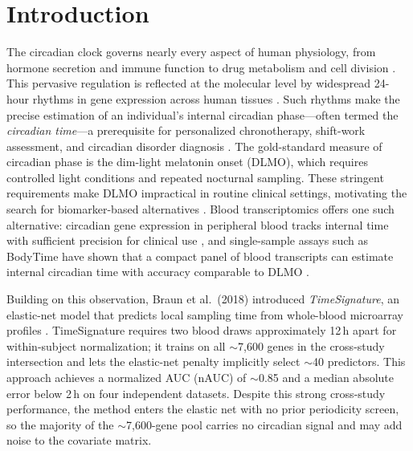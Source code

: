 \documentclass[10pt,a4paper]{article}
\begin{document}
\section{Introduction}

The circadian clock governs nearly every aspect of human physiology,
from hormone secretion and immune function to drug metabolism and cell
division \citep{Reppert2002}.
This pervasive regulation is reflected at the molecular level by
widespread 24-hour rhythms in gene expression across human tissues
\citep{Talamanca2023}.
Such rhythms make the precise estimation of an
individual's internal circadian phase---often termed the
\emph{circadian time}---a prerequisite for personalized chronotherapy,
shift-work assessment, and circadian disorder diagnosis
\citep{Archer2014}.
The gold-standard measure of circadian phase is the dim-light
melatonin onset (DLMO), which requires controlled light conditions
and repeated nocturnal sampling.
These stringent requirements make DLMO impractical in routine clinical
settings, motivating the search for biomarker-based alternatives
\citep{Ueda2004}.
Blood transcriptomics offers one such alternative: circadian gene
expression in peripheral blood tracks internal time with sufficient
precision for clinical use \citep{Moller2013}, and single-sample
assays such as BodyTime have shown that a compact panel of blood
transcripts can estimate internal circadian time with accuracy
comparable to DLMO \citep{Wittenbrink2018}.

Building on this observation, Braun et al.\ (2018) introduced
\emph{TimeSignature}, an elastic-net model that predicts local
sampling time from whole-blood microarray profiles \citep{Braun2018}.
TimeSignature requires two blood draws approximately 12\,h apart for
within-subject normalization;
it trains on all ${\sim}$7,600 genes in
the cross-study intersection and lets the elastic-net penalty
implicitly select ${\sim}$40 predictors.
This approach achieves a normalized AUC (nAUC) of ${\sim}$0.85 and a
median absolute error below 2\,h on four independent datasets.
Despite this strong cross-study performance, the method enters the
elastic net with no prior periodicity screen, so the majority of the
${\sim}$7,600-gene pool carries no circadian signal and may add noise
to the covariate matrix.
\end{document}
